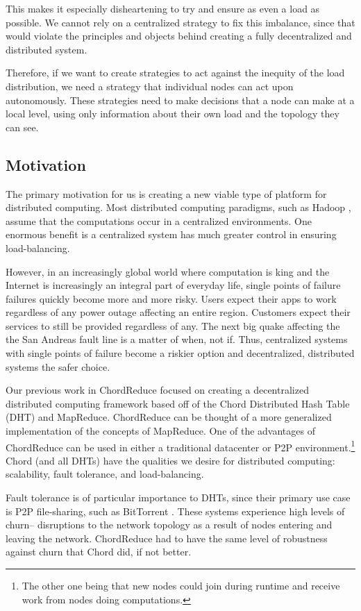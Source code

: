 This makes it especially disheartening to try and ensure as even a load as possible.
We cannot rely on a centralized strategy to fix this imbalance, since that would violate the principles and objects behind creating a fully decentralized and distributed system.

Therefore, if we want to create strategies to act against the inequity of the load distribution, we need a strategy that individual nodes can act upon autonomously.
These strategies need to make decisions that a node can make at a local level, using only information about their own load and the topology they can see.


\subsection{Motivation}
The primary motivation for us is creating a new viable type of platform for distributed computing.
Most distributed computing paradigms, such as Hadoop \cite{hadoop}, assume that the computations occur in a centralized environments.
One enormous benefit is a centralized system has much greater control in ensuring load-balancing.

However, in an increasingly global world where computation is king and the Internet is increasingly an integral part of everyday life, single points of failure failures quickly become more and more risky.
Users expect their apps to work regardless of any power outage affecting an entire region.
Customers expect their services to still be provided regardless of any.
The next big quake affecting the the San Andreas fault line is a matter of when, not if.
Thus, centralized systems with single points of failure become a riskier option and decentralized, distributed systems the safer choice.


Our previous work in ChordReduce \cite{chordreduce} focused on creating a decentralized distributed computing framework based off of the Chord Distributed Hash Table (DHT) and MapReduce.
ChordReduce can be thought of a more generalized implementation of the concepts of MapReduce.
One of the advantages of ChordReduce can be used in either a traditional datacenter or P2P environment.\footnote{The other one being that new nodes could join during runtime and receive work from nodes doing computations.}
Chord (and all DHTs) have the qualities we desire for distributed computing: scalability, fault tolerance, and load-balancing.

Fault tolerance is of particular importance to DHTs, since their primary use case is P2P file-sharing, such as BitTorrent \cite{bittorrent}.
These systems experience high levels of churn-- disruptions to the network topology as a result of nodes entering and leaving the network.
ChordReduce had to have the same level of robustness against churn that Chord did, if not better.

